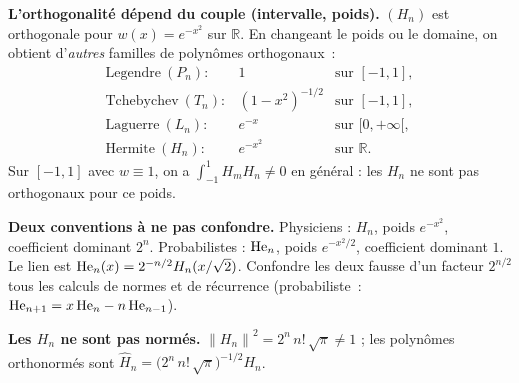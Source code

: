 \begin{mdframed}[style=cexbar]
  \textbf{L'orthogonalité dépend du couple (intervalle, poids).}\enspace
  $(H_n)$ est orthogonale pour $w(x)=e^{-x^2}$ sur $\mathbb{R}$. En
  changeant le poids ou le domaine, on obtient d'\emph{autres} familles de
  polynômes orthogonaux~:
  \[
    \begin{array}{lll}
      \text{Legendre}\ (P_n):    & 1                & \text{sur } [-1,1],\\
      \text{Tchebychev}\ (T_n):  & {(1-x^2)}^{-1/2} & \text{sur } [-1,1],\\
      \text{Laguerre}\ (L_n):    & e^{-x}           & \text{sur } [0,+\infty[,\\
      \text{Hermite}\ (H_n):     & e^{-x^2}         & \text{sur } \mathbb{R}.
    \end{array}
  \]
  Sur $[-1,1]$ avec $w\equiv 1$, on a $\int_{-1}^1 H_m H_n\neq 0$ en
  général : les $H_n$ ne sont pas orthogonaux pour ce poids.

  \smallskip\noindent
  \textbf{Deux conventions à ne pas confondre.}\enspace
  Physiciens : $H_n$, poids $e^{-x^2}$, coefficient dominant $2^n$.
  Probabilistes : $\mathrm{He}_n$, poids $e^{-x^2/2}$, coefficient dominant $1$.
  Le lien est $\mathrm{He}_n(x)=2^{-n/2}H_n(x/\sqrt{2})$. Confondre les deux fausse
  d'un facteur $2^{n/2}$ tous les calculs de normes et de récurrence
  (probabiliste~: $\mathrm{He}_{n+1}=x\,\mathrm{He}_n-n\,\mathrm{He}_{n-1}$).

  \smallskip\noindent
  \textbf{Les $H_n$ ne sont pas normés.}\enspace
  ${\|H_n\|}^2=2^n\,n!\,\sqrt{\pi}\neq 1$ ; les polynômes orthonormés sont
  $\widehat{H}_n=\bigl(2^n\,n!\,\sqrt{\pi}\bigr)^{-1/2}H_n$.
\end{mdframed}

\vspace{6pt}
\exolabel

